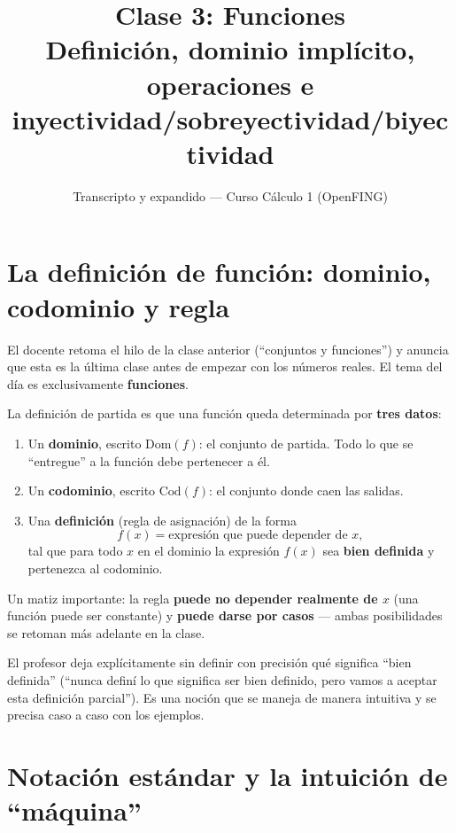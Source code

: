 \documentclass[12pt,a4paper]{article}
\title{\textbf{Clase 3: Funciones} \\[0.3em]
        \large{Definición, dominio implícito, operaciones e inyectividad/sobreyectividad/biyectividad}}
\author{Transcripto y expandido --- Curso Cálculo 1 (OpenFING)}
\date{}
\begin{document}
\maketitle
\thispagestyle{empty}
\newpage

\tableofcontents
\newpage

\section{La definición de función: dominio, codominio y regla}

El docente retoma el hilo de la clase anterior (``conjuntos y funciones'') y anuncia que esta es la última clase antes de empezar con los números reales. El tema del día es exclusivamente \textbf{funciones}.

La definición de partida es que una función queda determinada por \textbf{tres datos}:

\begin{enumerate}
  \item Un \textbf{dominio}, escrito $\mathrm{Dom}(f)$: el conjunto de partida. Todo lo que se ``entregue'' a la función debe pertenecer a él.
  \item Un \textbf{codominio}, escrito $\mathrm{Cod}(f)$: el conjunto donde caen las salidas.
  \item Una \textbf{definición} (regla de asignación) de la forma
  $$f(x) = \text{expresión que puede depender de } x,$$
  tal que para todo $x$ en el dominio la expresión $f(x)$ sea \textbf{bien definida} y pertenezca al codominio.
\end{enumerate}

Un matiz importante: la regla \textbf{puede no depender realmente de $x$} (una función puede ser constante) y \textbf{puede darse por casos} --- ambas posibilidades se retoman más adelante en la clase.

\begin{notebox}
El profesor deja explícitamente sin definir con precisión qué significa ``bien definida'' (``nunca definí lo que significa ser bien definido, pero vamos a aceptar esta definición parcial''). Es una noción que se maneja de manera intuitiva y se precisa caso a caso con los ejemplos.
\end{notebox}

\section{Notación estándar y la intuición de ``máquina''}
\end{document}
